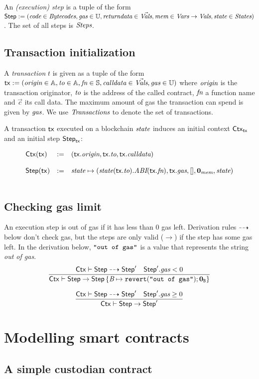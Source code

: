 \documentclass[12pt]{extarticle}
\begin{document}
An \emph{(execution) step} is a tuple of the form
$\mathsf{Step}:=(
    \textit{code}\in\textit{Bytecodes},
    \textit{gas}\in\mathbb{U},
    \textit{returndata}\in\vec{\textit{Vals}}, 
    \textit{mem}\in\textit{Vars}\to\textit{Vals}, 
    \textit{state}\in\textit{States}
)$. The set of all steps is $\textit{Steps}$.

\subsection{Transaction initialization}
A \emph{transaction} $t$ is given as a tuple of the form $\mathsf{tx}:=(\textit{origin}\in\mathbb{A},\textit{to}\in\mathbb{A},\textit{fn}\in\mathbb{S},\textit{calldata}\in\vec {\textit{Vals}}, \textit{gas}\in\mathbb{U})$ where $\textit{origin}$ is the transaction originator, $\textit{to}$ is the address of the called contract, $\textit{fn}$ a function name and $\vec c$ its call data. The maximum amount of gas the transaction can spend is given by $\textit{gas}$.
We use $\textit{Transactions}$ to denote the set of transactions.

A transaction $\mathsf{tx}$ executed on a blockchain $\textit{state}$ induces an initial context $\mathsf{Ctx}_{\mathsf{tx}}$ and an initial step $\mathsf{Step}_{\mathsf{tx}}$:

$$ \begin{array} {lll}
\mathsf{Ctx}(\mathsf{tx}) &:=& (\mathsf{tx}.\textit{origin},\mathsf{tx}.\textit{to},\mathsf{tx}.\textit{calldata})\\\\
\mathsf{Step}(\mathsf{tx})&:=& \textit{state} \mapsto (\textit{state}(\mathsf{tx}.\textit{to}).\textit{ABI}(\mathsf{tx}.\textit{fn}),\mathsf{tx}.\textit{gas}, [],\mathbf{0}_{\textit{mem}},\textit{state})\\\\
\end{array}$$



\subsection{Checking gas limit}
An execution step is out of gas if it has less than $0$ gas left. Derivation rules $\dashrightarrow$ below don't check gas, but the steps are only valid ($\rightarrow$) if the step has some gas left. In the derivation below, $\hbox{\rm\texttt{"out of gas"}}$ is a value that represents the string \emph{out of gas}.
\begin{equation}
\dfrac{
\mathsf{Ctx}\vdash\mathsf{Step}\dashrightarrow \mathsf{Step}' \quad \mathsf{Step}'.\textit{gas} < 0
}{
\mathsf{Ctx}\vdash\mathsf{Step}\to \mathsf{Step}\left\{\textit{B}\mapsto \mathtt{revert}(\hbox{\rm\texttt{"out of gas"}});\mathbf{0}_{\texttt{B}}\right\}
}
\end{equation}

\begin{equation}
\dfrac{
\mathsf{Ctx}\vdash\mathsf{Step}\dashrightarrow \mathsf{Step}' \quad \mathsf{Step}'.\textit{gas} \geq 0
}{
\mathsf{Ctx}\vdash\mathsf{Step}\to \mathsf{Step}'
}
\end{equation}

\newpage 

\newpage

\newpage


\section{Modelling smart contracts}

\subsection{A simple custodian contract}



\end{document}
